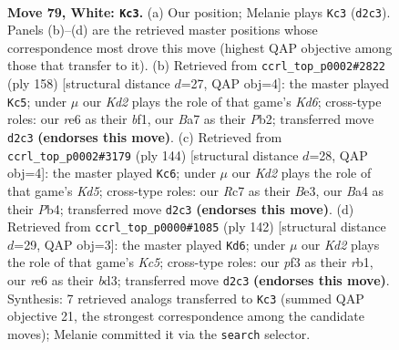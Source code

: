 \documentclass[11pt]{article}
\begin{document}
\clearpage

\begin{figure}[p]\centering
\begin{subfigure}{0.46\textwidth}\centering
\resizebox{\linewidth}{!}{%
\newchessgame
\chessboard[
  setfen={6k1/B1R5/4r3/8/B3p2p/5p1P/b2K1P2/8 w - - 68 79},
  showmover=false,
  pgfstyle=straightmove, color=movearrow, markmove={d2-c3}
]}
\caption{}
\end{subfigure}\hfill
\begin{subfigure}{0.46\textwidth}\centering
\resizebox{\linewidth}{!}{%
\newchessgame
\chessboard[
  setfen={8/8/3K4/1p5p/p6P/P1B5/1P6/3k1b2 w - - 18 80},
  showmover=false,
  pgfstyle=straightmove, color=movearrow, markmove={d6-c5}
]}
\caption{}
\end{subfigure}
\\[4pt]
\begin{subfigure}{0.46\textwidth}\centering
\resizebox{\linewidth}{!}{%
\newchessgame
\chessboard[
  setfen={8/4kp1p/6pP/1p1K2P1/1P6/4B3/7b/8 w - - 0 73},
  showmover=false,
  pgfstyle=straightmove, color=movearrow, markmove={d5-c6}
]}
\caption{}
\end{subfigure}\hfill
\begin{subfigure}{0.46\textwidth}\centering
\resizebox{\linewidth}{!}{%
\newchessgame
\chessboard[
  setfen={5k2/6p1/p1B5/P1K1R1P1/8/3b4/8/1r6 w - - 12 72},
  showmover=false,
  pgfstyle=straightmove, color=movearrow, markmove={c5-d6}
]}
\caption{}
\end{subfigure}
\caption{\textbf{Move 79, White: \texttt{Kc3}.} (a) Our position; Melanie plays \texttt{Kc3} (\texttt{d2c3}). Panels (b)--(d) are the retrieved master positions whose correspondence most drove this move (highest QAP objective among those that transfer to it). (b) Retrieved from \texttt{ccrl\_top\_p0002\#2822} (ply 158) [structural distance $d$=27, QAP obj=4]: the master played \texttt{Kc5}; under $\mu$ our \emph{Kd2} plays the role of that game's \emph{Kd6}; cross-type roles: our \emph{r}e6 as their \emph{b}f1, our \emph{B}a7 as their \emph{P}b2; transferred move \texttt{d2c3} \textbf{(endorses this move)}. (c) Retrieved from \texttt{ccrl\_top\_p0002\#3179} (ply 144) [structural distance $d$=28, QAP obj=4]: the master played \texttt{Kc6}; under $\mu$ our \emph{Kd2} plays the role of that game's \emph{Kd5}; cross-type roles: our \emph{R}c7 as their \emph{B}e3, our \emph{B}a4 as their \emph{P}b4; transferred move \texttt{d2c3} \textbf{(endorses this move)}. (d) Retrieved from \texttt{ccrl\_top\_p0000\#1085} (ply 142) [structural distance $d$=29, QAP obj=3]: the master played \texttt{Kd6}; under $\mu$ our \emph{Kd2} plays the role of that game's \emph{Kc5}; cross-type roles: our \emph{p}f3 as their \emph{r}b1, our \emph{r}e6 as their \emph{b}d3; transferred move \texttt{d2c3} \textbf{(endorses this move)}. Synthesis: 7 retrieved analogs transferred to \texttt{Kc3} (summed QAP objective 21, the strongest correspondence among the candidate moves); Melanie committed it via the \texttt{search} selector.}
\label{fig:thought-m156}
\end{figure}
\end{document}
